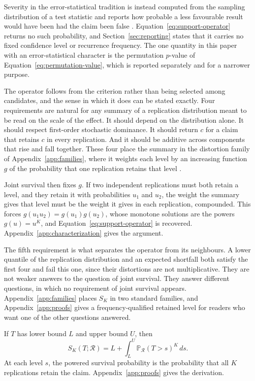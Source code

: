 \documentclass[11pt]{article}
\newcommand{\Regime}{\mathcal{R}}
\newcommand{\Prb}{\mathbb{P}}
\theoremstyle{remark}
\begin{document}
Severity in the error-statistical tradition is instead computed from the sampling distribution of a test statistic and reports how probable a less favourable result would have been had the claim been false \cite{mayo1996error}. Equation~\eqref{eq:support-operator} returns no such probability, and Section~\ref{sec:reporting} states that it carries no fixed confidence level or recurrence frequency. The one quantity in this paper with an error-statistical character is the permutation $p$-value of Equation~\eqref{eq:permutation-value}, which is reported separately and for a narrower purpose.

The operator follows from the criterion rather than being selected among candidates, and the sense in which it does can be stated exactly. Four requirements are natural for any summary of a replication distribution meant to be read on the scale of the effect. It should depend on the distribution alone. It should respect first-order stochastic dominance. It should return $c$ for a claim that retains $c$ in every replication. And it should be additive across components that rise and fall together. These four place the summary in the distortion family of Appendix~\ref{app:families}, where it weights each level by an increasing function $g$ of the probability that one replication retains that level \cite{schmeidler1986integral,yaari1987dual}.

Joint survival then fixes $g$. If two independent replications must both retain a level, and they retain it with probabilities $u_1$ and $u_2$, the weight the summary gives that level must be the weight it gives in each replication, compounded. This forces $g(u_1u_2)=g(u_1)g(u_2)$, whose monotone solutions are the powers $g(u)=u^K$, and Equation~\eqref{eq:support-operator} is recovered. Appendix~\ref{app:characterization} gives the argument.

The fifth requirement is what separates the operator from its neighbours. A lower quantile of the replication distribution and an expected shortfall both satisfy the first four and fail this one, since their distortions are not multiplicative. They are not weaker answers to the question of joint survival. They answer different questions, in which no requirement of joint survival appears. Appendix~\ref{app:families} places $S_K$ in two standard families, and Appendix~\ref{app:proofs} gives a frequency-qualified retained level for readers who want one of the other questions answered.

If $T$ has lower bound $L$ and upper bound $U$, then
\begin{equation}
S_K(T;\Regime)
=
L+\int_L^U
\Prb_{\Regime}(T>s)^K\,ds.
\label{eq:support-survival}
\end{equation}
At each level $s$, the powered survival probability is the probability that all $K$ replications retain the claim. Appendix~\ref{app:proofs} gives the derivation.
\end{document}
